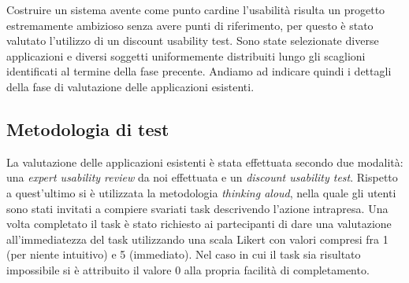
Costruire un sistema avente come punto cardine l'usabilità risulta un progetto
estremamente ambizioso senza avere punti di riferimento, per questo è stato
valutato l'utilizzo di un discount usability test.  Sono state selezionate
diverse applicazioni e diversi soggetti uniformemente distribuiti lungo gli
scaglioni identificati al termine della fase precente.  Andiamo ad indicare
quindi i dettagli della fase di valutazione delle applicazioni esistenti.

\subsection{Metodologia di test}
La valutazione delle applicazioni esistenti è stata effettuata secondo due
modalità: una \emph{expert usability review} da noi effettuata e un
\emph{discount usability test}.  Rispetto a quest'ultimo si è utilizzata la
metodologia \emph{thinking aloud}, nella quale gli utenti sono stati invitati a
compiere svariati task descrivendo l'azione intrapresa.  Una volta completato il
task è stato richiesto ai partecipanti di dare una valutazione all'immediatezza
del task utilizzando una scala Likert con valori compresi fra 1 (per niente
intuitivo) e 5 (immediato).  Nel caso in cui il task sia risultato impossibile
si è attribuito il valore 0 alla propria facilità di completamento.
